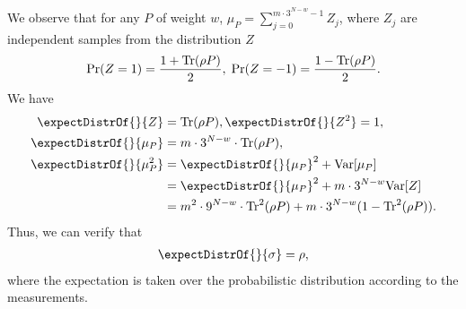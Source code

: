 We observe that for any $P$ of weight $w$,
$\mu_P=\sum_{j=0}^{m\cdot 3^{N-w}-1} Z_j$,
where $Z_j$ are independent samples from the distribution $Z$
\begin{align*}
\mathrm{Pr}(Z=1)=\frac{1+\operatorname{Tr} (\rho P)}{2}, \;
\mathrm{Pr}(Z=-1)=\frac{1-\operatorname{Tr} (\rho P)}{2}.
\end{align*}
We have
\begin{align*}
\expectDistrOf{}{Z}&=\tr (\rho P), \expectDistrOf{}{Z^2}=1, \\
\expectDistrOf{}{\mu_P}&=m\cdot 3^{N-w}\cdot\tr (\rho P), \\
\expectDistrOf{}{\mu_P^2}&=\expectDistrOf{}{\mu_P}^2+\Var[\mu_P] \\
&=\expectDistrOf{}{\mu_P}^2+m\cdot 3^{N-w}\Var[Z] \\
&=m^2\cdot 9^{N-w}\cdot \tr^2 (\rho P)+m\cdot 3^{N-w}(1-\tr^2 (\rho P)).
\end{align*}
Thus, we can verify that
\begin{align*}
\expectDistrOf{}{\sigma}=\rho,
\end{align*}
where the expectation is taken over the probabilistic distribution according to the measurements.


